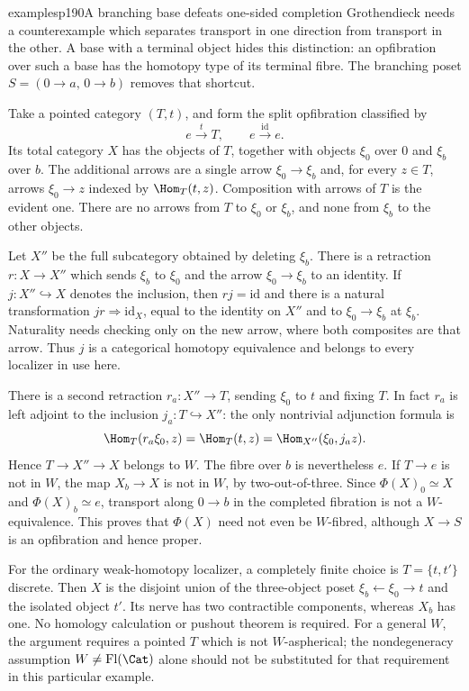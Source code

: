 \begin{dcomment}{examples}{p190}{A branching base defeats one-sided completion}
Grothendieck needs a counterexample which separates transport in one direction from transport in the other. A base with a terminal object hides this distinction: an opfibration over such a base has the homotopy type of its terminal fibre. The branching poset $S=(0\to a,\,0\to b)$ removes that shortcut.

Take a pointed category $(T,t)$, and form the split opfibration classified by
\[
 e\xrightarrow{t}T,\qquad e\xrightarrow{\mathrm{id}}e.
\]
Its total category $X$ has the objects of $T$, together with objects $\xi_0$ over $0$ and $\xi_b$ over $b$. The additional arrows are a single arrow $\xi_0\to\xi_b$ and, for every $z\in T$, arrows $\xi_0\to z$ indexed by $\Hom_T(t,z)$. Composition with arrows of $T$ is the evident one. There are no arrows from $T$ to $\xi_0$ or $\xi_b$, and none from $\xi_b$ to the other objects.

Let $X''$ be the full subcategory obtained by deleting $\xi_b$. There is a retraction $r:X\to X''$ which sends $\xi_b$ to $\xi_0$ and the arrow $\xi_0\to\xi_b$ to an identity. If $j:X''\hookrightarrow X$ denotes the inclusion, then $rj=\mathrm{id}$ and there is a natural transformation $jr\Rightarrow\mathrm{id}_X$, equal to the identity on $X''$ and to $\xi_0\to\xi_b$ at $\xi_b$. Naturality needs checking only on the new arrow, where both composites are that arrow. Thus $j$ is a categorical homotopy equivalence and belongs to every localizer in use here.

There is a second retraction $r_a:X''\to T$, sending $\xi_0$ to $t$ and fixing $T$. In fact $r_a$ is left adjoint to the inclusion $j_a:T\hookrightarrow X''$: the only nontrivial adjunction formula is
\[
 \Hom_T(r_a\xi_0,z)=\Hom_T(t,z)
              =\Hom_{X''}(\xi_0,j_a z).
\]
Hence $T\to X''\to X$ belongs to $W$. The fibre over $b$ is nevertheless $e$. If $T\to e$ is not in $W$, the map $X_b\to X$ is not in $W$, by two-out-of-three. Since $\Phi(X)_0\simeq X$ and $\Phi(X)_b\simeq e$, transport along $0\to b$ in the completed fibration is not a $W$-equivalence. This proves that $\Phi(X)$ need not even be $W$-fibred, although $X\to S$ is an opfibration and hence proper.

For the ordinary weak-homotopy localizer, a completely finite choice is $T=\{t,t'\}$ discrete. Then $X$ is the disjoint union of the three-object poset $\xi_b\leftarrow\xi_0\to t$ and the isolated object $t'$. Its nerve has two contractible components, whereas $X_b$ has one. No homology calculation or pushout theorem is required. For a general $W$, the argument requires a pointed $T$ which is not $W$-aspherical; the nondegeneracy assumption $W\ne\mathrm{Fl}(\Cat)$ alone should not be substituted for that requirement in this particular example.


\end{dcomment}
